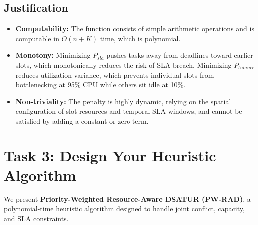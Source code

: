 \documentclass[11pt,a4paper]{article}
\begin{document}
\subsection{Justification}
\begin{itemize}
    \item \textbf{Computability:} The function consists of simple arithmetic operations and is computable in $O(n + K)$ time, which is polynomial.
    \item \textbf{Monotony:} Minimizing $P_{sla}$ pushes tasks away from deadlines toward earlier slots, which monotonically reduces the risk of SLA breach. Minimizing $P_{balance}$ reduces utilization variance, which prevents individual slots from bottlenecking at 95\% CPU while others sit idle at 10\%.
    \item \textbf{Non-triviality:} The penalty is highly dynamic, relying on the spatial configuration of slot resources and temporal SLA windows, and cannot be satisfied by adding a constant or zero term.
\end{itemize}

\newpage

\section{Task 3: Design Your Heuristic Algorithm}

We present \textbf{Priority-Weighted Resource-Aware DSATUR (PW-RAD)}, a polynomial-time heuristic algorithm designed to handle joint conflict, capacity, and SLA constraints.
\end{document}

